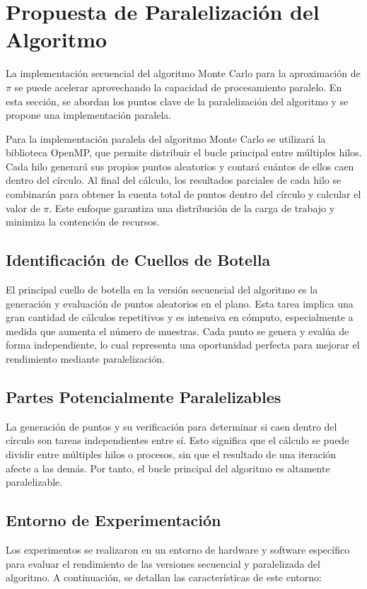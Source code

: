 \documentclass[a4paper, 10pt, onecolumn]{IEEEtran}
\begin{document}
\section{Propuesta de Paralelización del Algoritmo}
La implementación secuencial del algoritmo Monte Carlo para la aproximación de $\pi$ se puede acelerar aprovechando la capacidad de procesamiento paralelo. En esta sección, se abordan los puntos clave de la paralelización del algoritmo y se propone una implementación paralela.

Para la implementación paralela del algoritmo Monte Carlo se utilizará la biblioteca OpenMP, que permite distribuir el bucle principal entre múltiples hilos. Cada hilo generará sus propios puntos aleatorios y contará cuántos de ellos caen dentro del círculo. Al final del cálculo, los resultados parciales de cada hilo se combinarán para obtener la cuenta total de puntos dentro del círculo y calcular el valor de $\pi$. Este enfoque garantiza una distribución de la carga de trabajo y minimiza la contención de recursos.

\subsection{Identificación de Cuellos de Botella}
El principal cuello de botella en la versión secuencial del algoritmo es la generación y evaluación de puntos aleatorios en el plano. Esta tarea implica una gran cantidad de cálculos repetitivos y es intensiva en cómputo, especialmente a medida que aumenta el número de muestras. Cada punto se genera y evalúa de forma independiente, lo cual representa una oportunidad perfecta para mejorar el rendimiento mediante paralelización.

\subsection{Partes Potencialmente Paralelizables}
La generación de puntos y su verificación para determinar si caen dentro del círculo son tareas independientes entre sí. Esto significa que el cálculo se puede dividir entre múltiples hilos o procesos, sin que el resultado de una iteración afecte a las demás. Por tanto, el bucle principal del algoritmo es altamente paralelizable.


\subsection{Entorno de Experimentación}
Los experimentos se realizaron en un entorno de hardware y software específico para evaluar el rendimiento de las versiones secuencial y paralelizada del algoritmo. A continuación, se detallan las características de este entorno:
\end{document}
